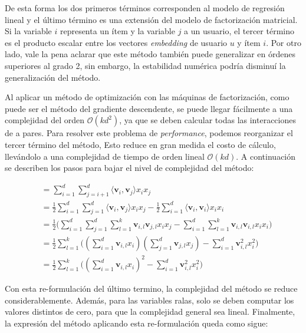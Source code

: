 \documentclass[11pt,a4paper,twoside]{thesis}
\begin{document}
De esta forma los dos primeros términos corresponden al modelo de regresión
lineal y el último término es una extensión del modelo de factorización
matricial. Si la variable $i$ representa un ítem y la variable $j$ a un
usuario, el tercer término es el producto escalar entre los vectores
\textit{embedding} de usuario $u$ y ítem $i$. Por otro lado, vale la pena
aclarar que este método también puede generalizar en órdenes superiores al
grado 2, sin embargo, la estabilidad numérica podría disminuí la generalización
del método.

Al aplicar un método de optimización con las máquinas de factorización, como
puede ser el método del gradiente descendente, se puede llegar fácilmente a una
complejidad del orden $\mathcal{O}(kd^2)$, ya que se deben calcular todas las
interacciones de a pares. Para resolver este problema de \textit{performance},
podemos reorganizar el tercer término del método, Esto reduce en gran medida el
costo de cálculo, llevándolo a una complejidad de tiempo de orden lineal
$\mathcal{O}(kd)$. A continuación se describen los pasos para bajar el nivel de
complejidad del método:

\begin{equation}
	\begin{split}
		 & =\sum_{i=1}^d \sum_{j=i+1}^d \langle\mathbf{v}_i, \mathbf{v}_j\rangle x_i x_j                                                                                                       \\
		 & = \frac{1}{2} \sum_{i=1}^d \sum_{j=1}^d\langle\mathbf{v}_i, \mathbf{v}_j\rangle x_i x_j - \frac{1}{2}\sum_{i=1}^d \langle\mathbf{v}_i, \mathbf{v}_i\rangle x_i x_i                  \\
		 & = \frac{1}{2} \big (\sum_{i=1}^d \sum_{j=1}^d \sum_{l=1}^k\mathbf{v}_{i, l} \mathbf{v}_{j, l} x_i x_j - \sum_{i=1}^d \sum_{l=1}^k \mathbf{v}_{i, l} \mathbf{v}_{i, l} x_i x_i \big) \\
		 & =  \frac{1}{2} \sum_{l=1}^k \big ((\sum_{i=1}^d \mathbf{v}_{i, l} x_i) (\sum_{j=1}^d \mathbf{v}_{j, l}x_j) - \sum_{i=1}^d \mathbf{v}_{i, l}^2 x_i^2 \big )                          \\
		 & = \frac{1}{2} \sum_{l=1}^k \big ((\sum_{i=1}^d \mathbf{v}_{i, l} x_i)^2 - \sum_{i=1}^d \mathbf{v}_{i, l}^2 x_i^2)
	\end{split}
\end{equation}

Con esta re-formulación del último termino, la complejidad del método se reduce
considerablemente. Además, para las variables ralas, solo se deben computar los
valores distintos de cero, para que la complejidad general sea lineal.
Finalmente, la expresión del método aplicando esta re-formulación queda como
sigue:
\end{document}
